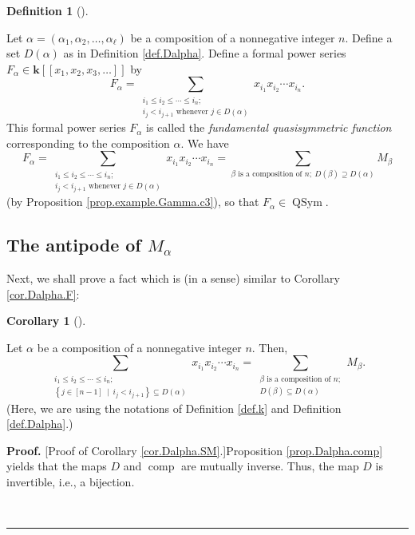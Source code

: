 \documentclass[numbers=enddot,12pt,final,onecolumn,notitlepage,abstracton]{scrartcl}
\theoremstyle{definition}
\newtheorem{defi}[theo]{Definition}
\newenvironment{definition}[1][]
{\begin{defi}[#1]\begin{leftbar}}
{\end{leftbar}\end{defi}}
\newtheorem{coro}[theo]{Corollary}
\newenvironment{corollary}[1][]
{\begin{coro}[#1]\begin{leftbar}}
{\end{leftbar}\end{coro}}
\newenvironment{proof}[1][Proof]{\noindent\textbf{#1.} }{\ \rule{0.5em}{0.5em}}
\let\sumnonlimits\sum
\renewcommand{\sum}{\sumnonlimits\limits}
\newenvironment{verlong}{}{}
\begin{document}
\begin{verlong}
\begin{footnotesize}
\begin{definition}
\label{def.Falpha}Let $\alpha=\left(  \alpha_{1},\alpha_{2},\ldots
,\alpha_{\ell}\right)  $ be a composition of a nonnegative integer $n$. Define
a set $D\left(  \alpha\right)  $ as in Definition \ref{def.Dalpha}. Define a
formal power series $F_{\alpha}\in\mathbf{k}\left[  \left[  x_{1},x_{2}%
,x_{3},\ldots\right]  \right]  $ by%
\begin{equation}
F_{\alpha}=\sum_{\substack{i_{1}\leq i_{2}\leq\cdots\leq i_{n};\\i_{j}%
<i_{j+1}\text{ whenever }j\in D\left(  \alpha\right)  }}x_{i_{1}}x_{i_{2}%
}\cdots x_{i_{n}}. \label{eq.def.Falpha.1}%
\end{equation}
This formal power series $F_{\alpha}$ is called the \textit{fundamental
quasisymmetric function} corresponding to the composition $\alpha$. We have%
\[
F_{\alpha}=\sum_{\substack{i_{1}\leq i_{2}\leq\cdots\leq i_{n};\\i_{j}%
<i_{j+1}\text{ whenever }j\in D\left(  \alpha\right)  }}x_{i_{1}}x_{i_{2}%
}\cdots x_{i_{n}}=\sum_{\beta\text{ is a composition of }n;\ D\left(
\beta\right)  \supseteq D\left(  \alpha\right)  }M_{\beta}%
\]
(by Proposition \ref{prop.example.Gamma.c3}), so that $F_{\alpha}%
\in\operatorname*{QSym}$.
\end{definition}

\subsection{The antipode of $M_{\alpha}$}

Next, we shall prove a fact which is (in a sense) similar to Corollary
\ref{cor.Dalpha.F}:

\begin{corollary}
\label{cor.Dalpha.SM}Let $\alpha$ be a composition of a nonnegative integer
$n$. Then,
\[
\sum_{\substack{i_{1}\leq i_{2}\leq\cdots\leq i_{n};\\\left\{  j\in\left[
n-1\right]  \ \mid\ i_{j}<i_{j+1}\right\}  \subseteq D\left(  \alpha\right)
}}x_{i_{1}}x_{i_{2}}\cdots x_{i_{n}}=\sum_{\substack{\beta\text{ is a
composition of }n;\\D\left(  \beta\right)  \subseteq D\left(  \alpha\right)
}}M_{\beta}.
\]
(Here, we are using the notations of Definition \ref{def.k} and Definition
\ref{def.Dalpha}.)
\end{corollary}

\begin{proof}
[Proof of Corollary \ref{cor.Dalpha.SM}.]Proposition \ref{prop.Dalpha.comp}
yields that the maps $D$ and $\operatorname*{comp}$ are mutually inverse.
Thus, the map $D$ is invertible, i.e., a bijection.


\end{proof}
\end{footnotesize}
\end{verlong}
\end{document}
